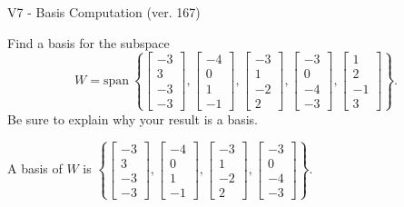 \begin{exercise}
  \begin{exerciseTitle}V7 - Basis Computation (ver. 167)\end{exerciseTitle}
  \begin{exerciseStatement}
    Find a basis for the subspace 
\[W=\mathrm{span}\ \left\{\left[\begin{array}{r}
-3 \\
3 \\
-3 \\
-3
\end{array}\right] , \left[\begin{array}{r}
-4 \\
0 \\
1 \\
-1
\end{array}\right] , \left[\begin{array}{r}
-3 \\
1 \\
-2 \\
2
\end{array}\right] , \left[\begin{array}{r}
-3 \\
0 \\
-4 \\
-3
\end{array}\right] , \left[\begin{array}{r}
1 \\
2 \\
-1 \\
3
\end{array}\right]\right\}.\]
 Be sure to explain why your result is a basis.


  \end{exerciseStatement}
  \begin{exerciseAnswer}
   A basis of \(W\) is  \(\left\{\left[\begin{array}{r}
-3 \\
3 \\
-3 \\
-3
\end{array}\right] , \left[\begin{array}{r}
-4 \\
0 \\
1 \\
-1
\end{array}\right] , \left[\begin{array}{r}
-3 \\
1 \\
-2 \\
2
\end{array}\right] , \left[\begin{array}{r}
-3 \\
0 \\
-4 \\
-3
\end{array}\right]\right\}\).
  


  \end{exerciseAnswer}
\end{exercise}